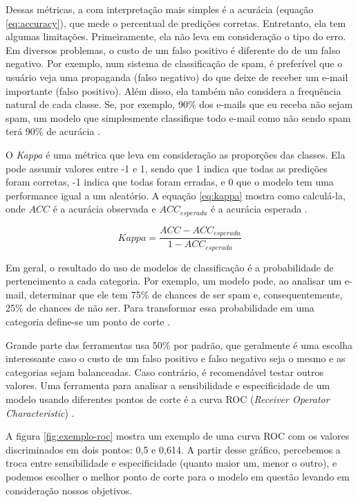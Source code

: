 \documentclass[a4paper,titlepage]{ppgi}\usepackage[]{graphicx}\usepackage[]{color}
\begin{document}
Dessas métricas, a com interpretação mais simples é a acurácia (equação
\ref{eq:accuracy}), que mede o percentual de predições corretas. Entretanto,
ela tem algumas limitações. Primeiramente, ela não leva em consideração o tipo
do erro. Em diversos problemas, o custo de um falso positivo é diferente do de
um falso negativo. Por exemplo, num sistema de classificação de spam, é
preferível que o usuário veja uma propaganda (falso negativo) do que deixe de
receber um e-mail importante (falso positivo). Além disso, ela também não
considera a frequência natural de cada classe. Se, por exemplo, 90\% dos
e-mails que eu receba não sejam spam, um modelo que simplesmente classifique
todo e-mail como não sendo spam terá 90\% de acurácia \cite{Kuhn2013}.

O \emph{Kappa} é uma métrica que leva em consideração as proporções das
classes. Ela pode assumir valores entre -1 e 1, sendo que 1 indica que todas as
predições foram corretas, -1 indica que todas foram erradas, e 0 que o modelo
tem uma performance igual a um aleatório. A equação \ref{eq:kappa} mostra como
calculá-la, onde $ACC$ é a acurácia observada e $ACC_{esperada}$ é a acurácia
esperada \cite{Cohen1960}.

\begin{equation}
\label{eq:kappa}
Kappa = \frac{ACC - ACC_{esperada}}{1 - ACC_{esperada}}
\end{equation}

Em geral, o resultado do uso de modelos de classificação é a probabilidade de
pertencimento a cada categoria. Por exemplo, um modelo pode, ao analisar um
e-mail, determinar que ele tem 75\% de chances de ser spam e, consequentemente,
25\% de chances de não ser. Para transformar essa probabilidade em uma
categoria define-se um ponto de corte \cite{Kuhn2013}.

Grande parte das ferramentas usa 50\% por padrão, que geralmente é uma escolha
interessante caso o custo de um falso positivo e falso negativo seja o mesmo e
as categorias sejam balanceadas. Caso contrário, é recomendável testar outros
valores. Uma ferramenta para analisar a sensibilidade e especificidade de um
modelo usando diferentes pontos de corte é a curva ROC (\emph{Receiver Operator
Characteristic}) \cite{Altman1994,Brown2006,Fawcett2006}.

A figura \ref{fig:exemplo-roc} mostra um exemplo de uma curva ROC com os
valores discriminados em dois pontos: 0,5 e 0,614. A partir desse gráfico,
percebemos a troca entre sensibilidade e especificidade (quanto maior um, menor
o outro), e podemos escolher o melhor ponto de corte para o modelo em questão
levando em consideração nossos objetivos.
\end{document}
